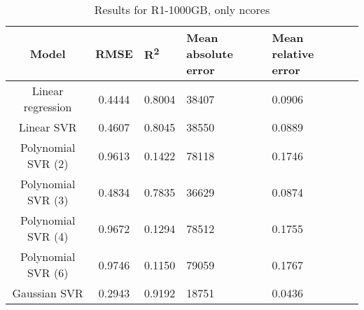 \begin{table}[H]
\centering
\begin{adjustbox}{center}
\begin{tabular}{c | c M{1.2cm} M{2.5cm} M{2.5cm} M{1.8cm}}
Model & RMSE & R\textsuperscript{2} & Mean absolute error & Mean relative error \tabularnewline
\hline
Linear regression & 0.4444 & 0.8004 &  38407 & 0.0906 \\
Linear SVR & 0.4607 & 0.8045 &  38550 & 0.0889 \\
Polynomial SVR (2) & 0.9613 & 0.1422 &  78118 & 0.1746 \\
Polynomial SVR (3) & 0.4834 & 0.7835 &  36629 & 0.0874 \\
Polynomial SVR (4) & 0.9672 & 0.1294 &  78512 & 0.1755 \\
Polynomial SVR (6) & 0.9746 & 0.1150 &  79059 & 0.1767 \\
Gaussian SVR & 0.2943 & 0.9192 &  18751 & 0.0436 \\
\end{tabular}
\end{adjustbox}
\\
\caption{Results for R1-1000GB, only ncores}
\label{tab:only_1_linear_R1_1000}
\end{table}
